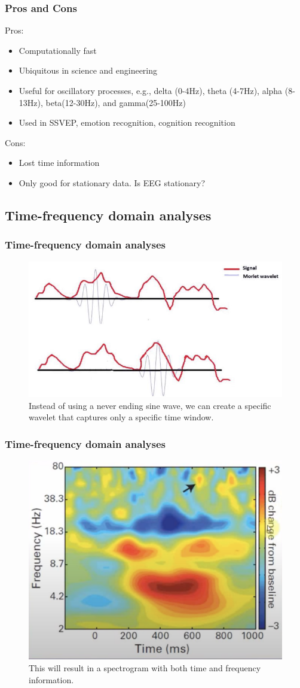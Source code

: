 \documentclass{beamer}
\begin{document}
\begin{frame}
\frametitle{Pros and Cons}
Pros:
\begin{itemize}
	\item Computationally fast
	\item Ubiquitous in science and engineering
	\item Useful for oscillatory processes, e.g.,  delta (0-4Hz), theta (4-7Hz), alpha (8-13Hz), beta(12-30Hz), and gamma(25-100Hz)
	\item Used in SSVEP, emotion recognition, cognition recognition
\end{itemize}
Cons:
\begin{itemize}
	\item Lost time information
	\item Only good for stationary data.  Is EEG stationary?
\end{itemize}
\end{frame}

\subsection{Time-frequency domain analyses}

\begin{frame}
\frametitle{Time-frequency domain analyses}
\begin{figure}
		\includegraphics[width=0.7\linewidth]{image/wt}
		\caption{Instead of using a never ending sine wave, we can create a specific wavelet that captures only a specific time window.}
\end{figure}
\end{frame}

\begin{frame}
\frametitle{Time-frequency domain analyses}
\begin{figure}
		\includegraphics[width=0.6\linewidth]{image/spectrogram2}
		\caption{This will result in a spectrogram with both time and frequency information.}
\end{figure}
\end{frame}
\end{document}
